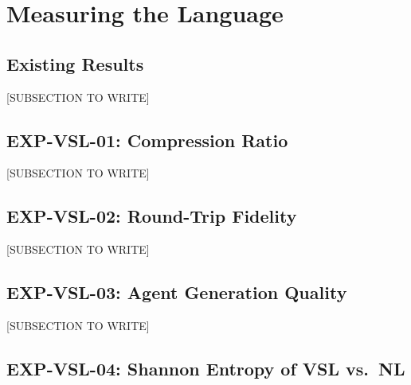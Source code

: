 \documentclass[12pt]{article}
\begin{document}
\section{Measuring the Language}
\label{sec:experiments}


\subsection{Existing Results}
\label{sec:existing}


[SUBSECTION TO WRITE]

\subsection{EXP-VSL-01: Compression Ratio}
\label{sec:exp01}


[SUBSECTION TO WRITE]

\subsection{EXP-VSL-02: Round-Trip Fidelity}
\label{sec:exp02}


[SUBSECTION TO WRITE]

\subsection{EXP-VSL-03: Agent Generation Quality}
\label{sec:exp03}


[SUBSECTION TO WRITE]

\subsection{EXP-VSL-04: Shannon Entropy of VSL vs.\ NL}
\label{sec:exp04}
\end{document}
